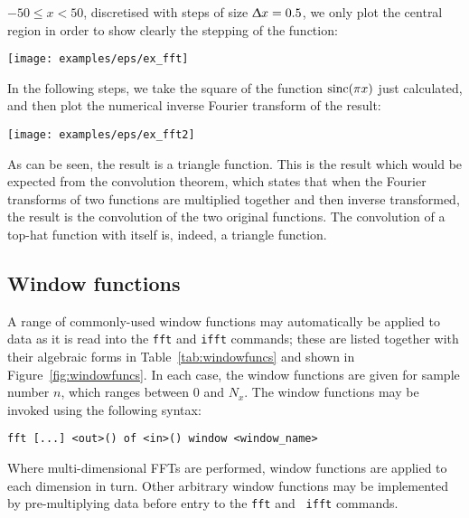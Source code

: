 {$-50\leq x<50$, discretised with steps of size $\Updelta x=0.5$, we only plot
the central region in order to show clearly the stepping of the function:
\nlscf
\begin{center}
\texttt{[image: examples/eps/ex\_fft]}
\end{center}
\nlscf
In the following steps, we take the square of the function ${\rm sinc}(\pi x)$ just
calculated, and then plot the numerical inverse Fourier transform of the
result:
\nlscf
{}\newline
{}\newline
{}
\nlscf
\begin{center}
\texttt{[image: examples/eps/ex\_fft2]}
\end{center}
\nlscf
As can be seen, the result is a triangle function. This is the result which
would be expected from the convolution theorem, which states that when the
Fourier transforms of two functions are multiplied together and then inverse
transformed, the result is the convolution of the two original functions. The
convolution of a top-hat function with itself is, indeed, a triangle function.
}

\subsection{Window functions}

A range of commonly-used window functions may automatically be applied to data
as it is read into the {\tt fft} and {\tt ifft} commands; these are listed
together with their algebraic forms in Table~\ref{tab:windowfuncs} and shown in
Figure~\ref{fig:windowfuncs}. In each case, the window functions are given for
sample number $n$, which ranges between $0$ and $N_x$. The window functions may
be invoked using the following syntax:

\begin{verbatim}
fft [...] <out>() of <in>() window <window_name>
\end{verbatim}

\noindent Where multi-dimensional FFTs are performed, window functions are
applied to each dimension in turn.  Other arbitrary window functions may be
implemented by pre-multiplying data before entry to the {\tt fft} and {\tt
ifft} commands.

